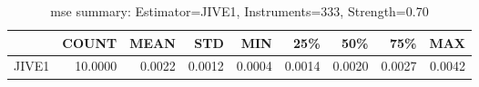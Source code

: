 \begin{table}[ht]
\centering
\caption{mse summary: Estimator=JIVE1, Instruments=333, Strength=0.70}
\begin{tabular}{lrrrrrrrr}
\toprule
 & COUNT & MEAN & STD & MIN & 25\% & 50\% & 75\% & MAX \\
\midrule
JIVE1 & 10.0000 & 0.0022 & 0.0012 & 0.0004 & 0.0014 & 0.0020 & 0.0027 & 0.0042 \\
\bottomrule
\end{tabular}
\end{table}

